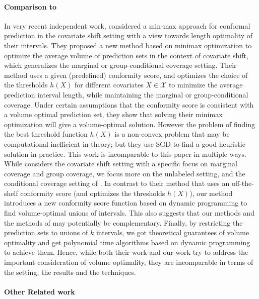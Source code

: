 \paragraph{Comparison to \citet{kiyani2024length}} In very recent independent work, \citet{kiyani2024length} considered a min-max approach for conformal prediction in the covariate shift setting with a view towards length optimality of their intervals. They proposed a new method based on minimax optimization to optimize the average volume of prediction sets in the context of covariate shift, which generalizes the marginal or group-conditional coverage setting. 
Their method uses a given (predefined) conformity score, and optimizes the choice of the thresholds $h(X)$ for different covariates $X \in \mathcal{X}$ %
to minimize the average prediction interval length, while maintaining the marginal or group-conditional coverage. Under certain assumptions that the conformity score is consistent with a volume optimal prediction set, they show that solving their minimax optimization will give a volume-optimal solution. However the problem of finding the best threshold function $h(X)$ is a non-convex problem that may be computational inefficient in theory; but they use SGD to find a good heuristic solution in practice. This work is incomparable to this paper in multiple ways. While \citet{kiyani2024length} considers the covariate shift setting with a specific focus on marginal coverage and group coverage, we focus more on the unlabeled setting, and the conditional coverage setting of \citet{chernozhukov2021distributional}. 
In contrast to their method that uses an off-the-shelf conformity score (and optimizes the thresholds $h(X)$), our method introduces a new conformity score function based on dynamic programming to find volume-optimal unions of intervals. This also suggests that our methods and the methods of \citet{kiyani2024length} may potentially be complementary. Finally, by restricting the prediction sets to unions of $k$ intervals, we got theoretical guarantees of volume optimality and get polynomial time algorithms based on dynamic programming to achieve them. Hence, while both their work and our work try to address the important consideration of volume optimality, they are incomparable in terms of the setting, the results and the techniques.

\paragraph{Other Related work}


